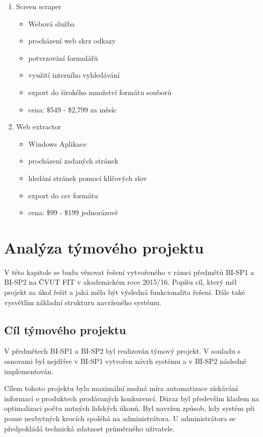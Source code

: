 \documentclass[thesis=B,czech]{FITthesis}[2012/06/26]
\begin{document}
\begin{enumerate}
\item Screen scraper \cite{ScreenScraper}

  \begin{itemize}
    \item Webová služba
    \item procházení web skrz odkazy
    \item potvrzování formulářů
    \item využití interního vyhledávání
    \item export do širokého množství formátu souborů
    \item cena: \$549 - \$2,799 za měsíc
  \end{itemize}
  
\item Web extractor \cite{WebExtractor}

  \begin{itemize}
    \item Windows Aplikace
    \item procházení zadaných stránek
    \item hledání stránek pomocí klíčových slov
    \item export do csv formátu
    \item cena: \$99 - \$199 jednorázově
  \end{itemize}


\end{enumerate}

\newpage

\chapter{Analýza týmového projektu}
V této kapitole se budu věnovat řešení vytvořeného v rámci předmětů BI-SP1 a BI-SP2 na ČVUT FIT v akademickém roce 2015/16.
Popíšu cíl, který měl projekt za úkol řešit a jaká měla být výsledná funkcionalita řešení. Dále také vysvětlím základní strukturu
navrženého systému.

\section{Cíl týmového projektu}

V předmětech BI-SP1 a BI-SP2 byl realizován týmový projekt. V souladu s osnovami byl nejdříve v BI-SP1 vytvořen návrh
systému a v BI-SP2 následně implementován.
\par
Cílem tohoto projektu byla maximální možná míra automatizace získávání informací o produktech prodávaných konkurencí. Důraz byl především kladem na optimalizaci počtu nutných lidských úkonů. Byl navržen způsob, kdy systém při pouze nezbytných krocích spoléhá na administrátora.
U administrátora se předpokládá technická zdatnost průměrného uživatele.
\par
\end{document}
